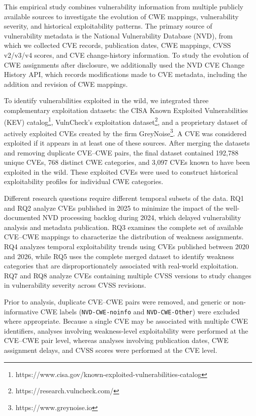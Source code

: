\documentclass[conference,compsoc]{IEEEtran}
\begin{document}
This empirical study combines vulnerability information from multiple publicly available sources to investigate the evolution of CWE mappings, vulnerability severity, and historical exploitability patterns. The primary source of vulnerability metadata is the National Vulnerability Database (NVD), from which we collected CVE records, publication dates, CWE mappings, CVSS v2/v3/v4 scores, and CVE change-history information. To study the evolution of CWE assignments after disclosure, we additionally used the NVD CVE Change History API, which records modifications made to CVE metadata, including the addition and revision of CWE mappings.

To identify vulnerabilities exploited in the wild, we integrated three complementary exploitation datasets: the CISA Known Exploited Vulnerabilities (KEV) catalog\footnote{https://www.cisa.gov/known-exploited-vulnerabilities-catalog}, VulnCheck's exploitation dataset\footnote{https://research.vulncheck.com/}, and  a proprietary dataset of actively exploited CVEs created by the firm GreyNoise\footnote{ https://www.greynoise.io}. A CVE was considered exploited if it appears in at least one of these sources. After merging the datasets and removing duplicate CVE--CWE pairs, the final dataset contained 192,788 unique CVEs, 768 distinct CWE categories, and 3,097 CVEs known to have been exploited in the wild. These exploited CVEs were used to construct historical exploitability profiles for individual CWE categories.

Different research questions require different temporal subsets of the data. RQ1 and RQ2 analyze CVEs published in 2025 to minimize the impact of the well-documented NVD processing backlog during 2024, which delayed vulnerability analysis and metadata publication. RQ3 examines the complete set of available CVE--CWE mappings to characterize the distribution of weakness assignments. RQ4 analyzes temporal exploitability trends using CVEs published between 2020 and 2026, while RQ5 uses the complete merged dataset to identify weakness categories that are disproportionately associated with real-world exploitation. RQ7 and RQ8 analyze CVEs containing multiple CVSS versions to study changes in vulnerability severity across CVSS revisions.

Prior to analysis, duplicate CVE--CWE pairs were removed, and generic or non-informative CWE labels (\texttt{NVD-CWE-noinfo} and \texttt{NVD-CWE-Other}) were excluded where appropriate. Because a single CVE may be associated with multiple CWE identifiers, analyses involving weakness-level exploitability were performed at the CVE--CWE pair level, whereas analyses involving publication dates, CWE assignment delays, and CVSS scores were performed at the CVE level.
\end{document}
